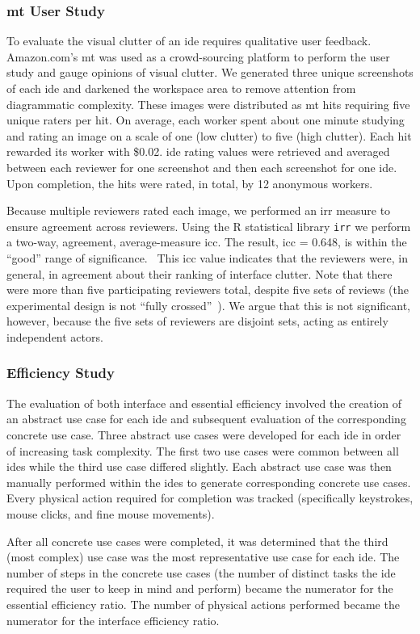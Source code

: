\subsubsection{\acl{mt} User Study} \label{subsubsec:mturk} To evaluate the
visual clutter of an \ac{ide} requires qualitative user feedback.
Amazon.com's \ac{mt} was used as a crowd-sourcing platform to perform the
user study and gauge opinions of visual clutter. We generated three unique
screenshots of each \ac{ide} and darkened the workspace area to remove
attention from diagrammatic complexity. These images were distributed
as \ac{mt} \acp{hit} requiring five unique raters per \ac{hit}. On average,
each worker spent about one minute studying and rating an image on a scale
of one (low clutter) to five (high clutter). Each \ac{hit} rewarded its
worker with \$0.02. \ac{ide} rating values were retrieved and averaged
between each reviewer for one screenshot and then each screenshot for one
\ac{ide}. Upon completion, the \acp{hit} were rated, in total, by 12
anonymous workers.

Because multiple reviewers rated each image, we performed an \ac{irr}
measure to ensure agreement across reviewers. Using the R statistical
library \texttt{irr} we perform a two-way, agreement, average-measure
\ac{icc}. The result, \ac{icc} = 0.648, is within the ``good'' range of
significance.~\cite{cicchetti1994,hallgren2012} This \ac{icc} value
indicates that the reviewers were, in general, in agreement about their
ranking of interface clutter. Note that there were more than five
participating reviewers total, despite five sets of reviews (\ie the
experimental design is not ``fully crossed''~\cite{hallgren2012}). We argue
that this is not significant, however, because the five sets of reviewers
are disjoint sets, acting as entirely independent actors.

\subsubsection{Efficiency Study} \label{subsubsec:efficiency} The
evaluation of both interface and essential efficiency involved the creation
of an abstract use case for each \ac{ide} and subsequent evaluation of the
corresponding concrete use case. Three abstract use cases were developed
for each \ac{ide} in order of increasing task complexity. The first two use
cases were common between all \acp{ide} while the third use case differed
slightly. Each abstract use case was then manually performed within the
\acp{ide} to generate corresponding concrete use cases. Every physical
action required for completion was tracked (specifically keystrokes, mouse
clicks, and fine mouse movements).

After all concrete use cases were completed, it was determined that the
third (most complex) use case was the most representative use case for each
\ac{ide}. The number of steps in the concrete use cases (\ie the number of
distinct tasks the \ac{ide} required the user to keep in mind and perform)
became the numerator for the essential efficiency ratio. The number of
physical actions performed became the numerator for the interface
efficiency ratio.
